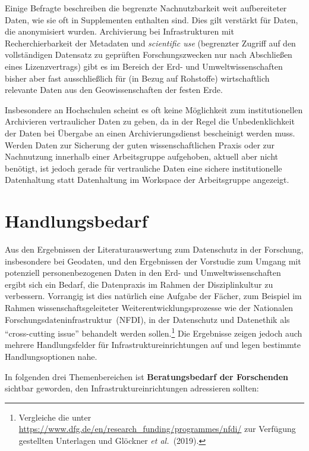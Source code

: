 \documentclass[a4paper,
fontsize=11pt,
oneside,
numbers=noperiodatend,
parskip=half-,
bibliography=totoc,
final
]{scrartcl}
\begin{document}
Einige Befragte beschreiben die begrenzte Nachnutzbarkeit weit
aufbereiteter Daten, wie sie oft in Supplementen enthalten sind. Dies
gilt verstärkt für Daten, die anonymisiert wurden. Archivierung bei
Infrastrukturen mit Recherchierbarkeit der Metadaten und
\emph{scientific use} (begrenzter Zugriff auf den vollständigen
Datensatz zu geprüften Forschungszwecken nur nach Abschließen eines
Lizenzvertrags) gibt es im Bereich der Erd- und Umweltwissenschaften
bisher aber fast ausschließlich für (in Bezug auf Rohstoffe)
wirtschaftlich relevante Daten aus den Geowissenschaften der festen
Erde.

Insbesondere an Hochschulen scheint es oft keine Möglichkeit zum
institutionellen Archivieren vertraulicher Daten zu geben, da in der
Regel die Unbedenklichkeit der Daten bei Übergabe an einen
Archivierungsdienst bescheinigt werden muss. Werden Daten zur Sicherung
der guten wissenschaftlichen Praxis oder zur Nachnutzung innerhalb einer
Arbeitsgruppe aufgehoben, aktuell aber nicht benötigt, ist jedoch gerade
für vertrauliche Daten eine sichere institutionelle Datenhaltung statt
Datenhaltung im Workspace der Arbeitsgruppe angezeigt.

\hypertarget{handlungsbedarf}{%
\section{Handlungsbedarf}\label{handlungsbedarf}}

Aus den Ergebnissen der Literaturauswertung zum Datenschutz in der
Forschung, insbesondere bei Geodaten, und den Ergebnissen der Vorstudie
zum Umgang mit potenziell personenbezogenen Daten in den Erd- und
Umweltwissenschaften ergibt sich ein Bedarf, die Datenpraxis im Rahmen
der Disziplinkultur zu verbessern. Vorrangig ist dies natürlich eine
Aufgabe der Fächer, zum Beispiel im Rahmen wissenschaftsgeleiteter
Weiterentwicklungsprozesse wie der Nationalen
Forschungsdateninfrastruktur~(NFDI), in der Datenschutz und Datenethik
als \enquote{cross-cutting issue} behandelt werden sollen.\footnote{Vergleiche
  die unter
  \url{https://www.dfg.de/en/research_funding/programmes/nfdi/} zur
  Verfügung gestellten Unterlagen und Glöckner \emph{et al.~}(2019).}
Die Ergebnisse zeigen jedoch auch mehrere Handlungsfelder für
Infrastruktureinrichtungen auf und legen bestimmte Handlungsoptionen
nahe.

In folgenden drei Themenbereichen ist \textbf{Beratungsbedarf der
Forschenden} sichtbar geworden, den Infrastruktureinrichtungen
adressieren sollten:
\end{document}
